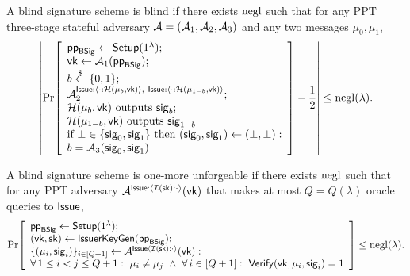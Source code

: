 \begin{definition}[Blindness]\label{def:bs-blindness}
	A blind signature scheme is blind if there exists \(\mathrm{negl}\) such that for any PPT three-stage stateful adversary
	\(\mathcal{A}=(\mathcal{A}_1,\mathcal{A}_2,\mathcal{A}_3)\) and any two messages \(\mu_0,\mu_1\),
	\[
	\left|\Pr\!\left[
	\begin{array}{l}
		\mathsf{pp}_{\mathsf{BSig}}\gets \mathsf{Setup}(1^\lambda);\\
		\mathsf{vk}\gets \mathcal{A}_1(\mathsf{pp}_{\mathsf{BSig}});\\ b\overset{\$}{\leftarrow}\{0,1\};\\
		\mathcal{A}_2^{\mathsf{Issue}:\langle \cdot: \mathcal{H}(\mu_b,\mathsf{vk})\rangle ,~ \mathsf{Issue}:\langle \cdot: \mathcal{H}(\mu_{1-b},\mathsf{vk})\rangle }; \\
		\mathcal{H}(\mu_b,\mathsf{vk}) \text{ outputs }\mathsf{sig}_b;\\
		\mathcal{H}(\mu_{1-b},\mathsf{vk}) \text{ outputs }\mathsf{sig}_{1-b}\\
		\text{if }\bot\in\{\mathsf{sig}_0,\mathsf{sig}_1\}\text{ then }(\mathsf{sig}_0,\mathsf{sig}_1)\gets(\bot,\bot):\\
		b=\mathcal{A}_3(\mathsf{sig}_0,\mathsf{sig}_1)
	\end{array}
	\right]-\frac{1}{2}\right|
	\le \mathrm{negl}(\lambda).
	\]
\end{definition}



\begin{definition}\label{def:bs-euf-cma}
A blind signature scheme is one-more unforgeable if there exists \(\mathrm{negl}\) such that for any PPT adversary
\(\mathcal{A}^{\mathsf{Issue}: \langle \mathcal{I}(\mathsf{sk}): \cdot \rangle}(\mathsf{vk})\) that makes at most \(Q=Q(\lambda)\) oracle queries to \(\mathsf{Issue}\),
\[
  \Pr\!\left[
    \begin{array}{l}
     	\PublicParamsBS \gets \Setup(\SecParam); \\
      (\vk,\sk)\gets \IKeyGen(\PublicParamsBS);\\
      \{(\mu_i,\sig_i)\}_{i\in[Q+1]}\gets \adversary^{\Issue \langle \Issuer(\sk):\cdot \rangle}(\vk):\\
      \forall\,1\le i<j\le Q+1:\ \mu_i\neq \mu_j\ \land\ \forall\,i\in[Q+1]:\ \Verify(\vk,\mu_i,\sig_i)=1
    \end{array}
  \right]
  \le \negl(\lambda).
\]
\end{definition}


